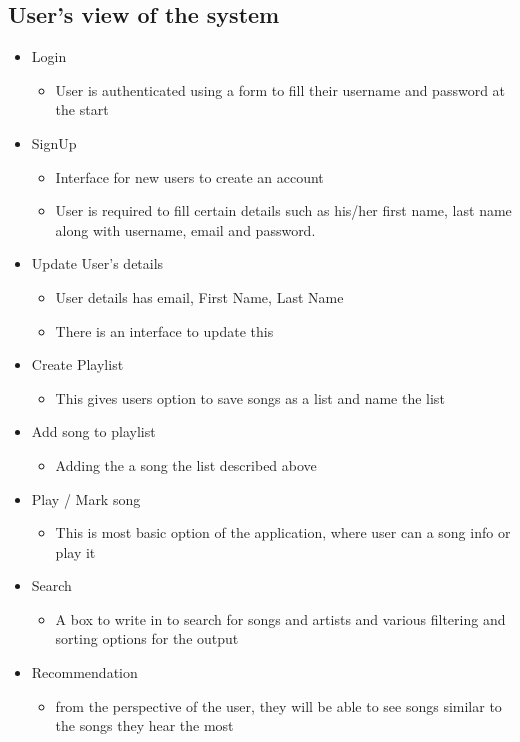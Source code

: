 \documentclass[10pt]{article}
\begin{document}
\subsection{User's view of the system}
\begin{itemize}
    \item Login
    \begin{itemize}
        \item User is authenticated using a form to fill their username and password at the start
    \end{itemize}
    \item SignUp
    \begin{itemize}
        \item Interface for new users to create an account
        \item User is required to fill certain details such as his/her first name, last name along with username, email and password.
    \end{itemize}
    \item Update User's details
    \begin{itemize}
        \item User details has email, First Name, Last Name
        \item There is an interface to update this
    \end{itemize}
    \item Create Playlist
    \begin{itemize}
        \item This gives users option to save songs as a list and name the list
    \end{itemize}
    \item Add song to playlist
    \begin{itemize}
        \item Adding the a song the list described above
    \end{itemize}
    \item Play / Mark song
    \begin{itemize}
        \item This is most basic option of the application, where user can a song info or play it
    \end{itemize}
    \item Search
    \begin{itemize}
        \item A box to write in to search for songs and artists and various filtering and sorting options for the output
    \end{itemize}
    \item Recommendation
    \begin{itemize}
        \item from the perspective of the user, they will be able to see songs similar to the songs they hear the most
    \end{itemize}
\end{itemize}
\end{document}
